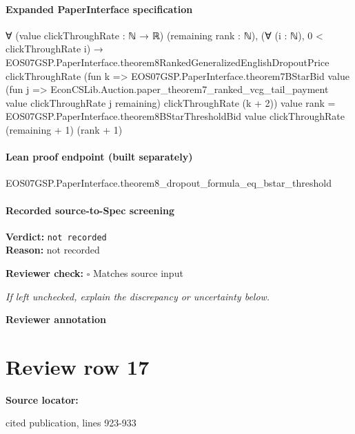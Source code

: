 \documentclass[10pt]{article}
\newcommand{\reviewerbox}{%
  \par\noindent\fbox{\parbox{0.96\linewidth}{\rule{0pt}{0.38in}}}\par
}
\newcommand{\reviewmatch}[1]{%
  \par\noindent\textbf{Reviewer check:} $\square$\; #1\par
  \noindent\emph{If left unchecked, explain the discrepancy or uncertainty below.}\par
}
\begin{document}
\paragraph{Expanded PaperInterface specification}
\begin{ReviewVerbatim}
∀ (value clickThroughRate : ℕ → ℝ) (remaining rank : ℕ),
  (∀ (i : ℕ), 0 < clickThroughRate i) →
    EOS07GSP.PaperInterface.theorem8RankedGeneralizedEnglishDropoutPrice clickThroughRate
        (fun k =>
          EOS07GSP.PaperInterface.theorem7BStarBid value
            (fun j => EconCSLib.Auction.paper_theorem7_ranked_vcg_tail_payment value clickThroughRate j remaining)
            clickThroughRate (k + 2))
        value rank =
      EOS07GSP.PaperInterface.theorem8BStarThresholdBid value clickThroughRate (remaining + 1) (rank + 1)
\end{ReviewVerbatim}

\paragraph{Lean proof endpoint (built separately)}\begin{ReviewVerbatim}
EOS07GSP.PaperInterface.theorem8_dropout_formula_eq_bstar_threshold
\end{ReviewVerbatim}

\paragraph{Recorded source-to-Spec screening}
\textbf{Verdict:} \texttt{not recorded}
\\
\textbf{Reason:} not recorded
\reviewmatch{Matches source input}
\noindent\textbf{Reviewer annotation}\par
\reviewerbox
\clearpage
\hypertarget{source-claim-be97e1c8d79276a9}{}
\section*{Review row 17}
\textbf{Source locator:} {\footnotesize\raggedright cited publication, lines 923-\allowbreak{}933\par}
\end{document}
